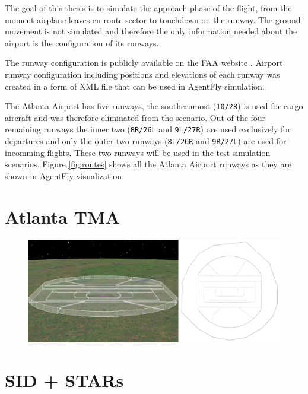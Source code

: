 The goal of this thesis is to simulate the approach phase of the flight, from the moment airplane leaves en-route sector to touchdown on the runway. The ground movement is not simulated and therefore the only information needed about the airport is the configuration of its runways.

The runway configuration is publicly available on the FAA website \cite{atlanta-diagram}. Airport runway configuration including positions and elevations of each runway was created in a form of XML file that can be used in AgentFly simulation.

The Atlanta Airport has five runways, the southernmost (\texttt{10/28}) is used for cargo aircraft and was therefore eliminated from the scenario. Out of the four remaining runways the inner two (\texttt{8R/26L} and \texttt{9L/27R}) are used exclusively for departures and only the outer two runways (\texttt{8L/26R} and \texttt{9R/27L}) are used for incomming flights. These two runways will be used in the test simulation scenarios. Figure \ref{fig:routes} shows all the Atlanta Airport runways as they are shown in AgentFly visualization.

\section{Atlanta TMA}

\begin{figure}[h]
    \centering
    \includegraphics[width=\textwidth]{figures/tracon.png}
    \caption{}
    \label{fig:tracon}
\end{figure}


\section{SID + STARs}

